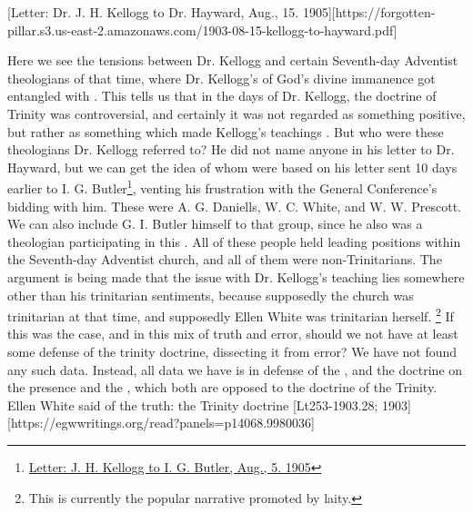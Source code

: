 
[Letter: Dr. J. H. Kellogg to Dr. Hayward, Aug., 15. 1905][https://forgotten-pillar.s3.us-east-2.amazonaws.com/1903-08-15-kellogg-to-hayward.pdf]

Here we see the tensions between Dr. Kellogg and certain Seventh-day Adventist theologians of that time, where Dr. Kellogg's  of God's divine immanence got entangled with . This tells us that in the days of Dr. Kellogg, the doctrine of Trinity was controversial, and certainly it was not regarded as something positive, but rather as something which made Kellogg's teachings . But who were these theologians Dr. Kellogg referred to? He did not name anyone in his letter to Dr. Hayward, but we can get the idea of whom  were based on his letter sent 10 days earlier to I. G. Butler\footnote{\href{https://forgotten-pillar.s3.us-east-2.amazonaws.com/1905-08-05-kellogg-butler.pdf}{Letter: J. H. Kellogg to I. G. Butler, Aug., 5. 1905}}, venting his frustration with the General Conference's bidding with him. These were A. G. Daniells, W. C. White, and W. W. Prescott. We can also include G. I. Butler himself to that group, since he also was a theologian participating in this . All of these people held leading positions within the Seventh-day Adventist church, and all of them were non-Trinitarians. The argument is being made that the issue with Dr. Kellogg's teaching lies somewhere other than his trinitarian sentiments, because supposedly the church was trinitarian at that time, and supposedly Ellen White was trinitarian herself. \footnote{This is currently the popular narrative promoted by laity.} If this was the case, and in this mix of truth and error, should we not have at least some defense of the trinity doctrine, dissecting it from error? We have not found any such data. Instead, all data we have is in defense of the , and the doctrine on the presence and the , which both are opposed to the doctrine of the Trinity. Ellen White said of the truth: the Trinity doctrine [Lt253-1903.28; 1903][https://egwwritings.org/read?panels=p14068.9980036]

